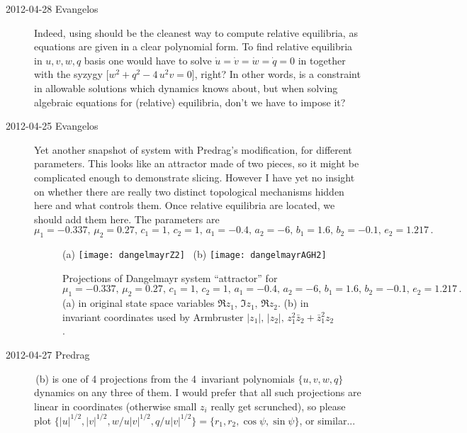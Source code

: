 \begin{description}
\item[2012-04-28 Evangelos] Indeed, using  should be the
cleanest way to compute relative equilibria, as equations are given in
a clear polynomial form.
To find relative equilibria in $u,v,w,q$ basis
one would have to solve $\dot{u}=\dot{v}=\dot{w}=\dot{q}=0$ in 
together with the syzygy 
[$w^2+q^2 - 4\,u^2v =0$], right?
In other words,  is a constraint in allowable solutions which
dynamics knows about, but when solving algebraic equations for (relative)
equilibria, don't we have to impose it?

\item[2012-04-25 Evangelos] Yet another snapshot of {\twoMode}
system with Predrag's modification, for different parameters. This looks
like an attractor made of two pieces, so it might be complicated enough
to demonstrate slicing. However I have yet no insight on whether there
are really two distinct topological mechanisms hidden here and what
controls them. Once relative equilibria are located, we should add them
here. The parameters are
\[
 \mu_1 = -0.337,\, \mu_2 = 0.27,\, c_1 = 1,\, c_2 = 1,\,
 a_1 = -0.4,\, a_2 = -6,\, b_1 = 1.6,\,  b_2 = -0.1,\, e_2 = 1.217
 \,.
\]

 \begin{figure}[h]
\centering
 (a) \texttt{[image: dangelmayrZ2]}~
 (b) \texttt{[image: dangelmayrAGH2]}~
\caption{Projections of Dangelmayr system 
``attractor'' for $\mu_1 = -0.337,\, \mu_2 = 0.27,\, c_1 = 1,\, c_2 = 1,\,
a_1 = -0.4,\, a_2 = -6,\, b_1 = 1.6,\,  b_2 = -0.1,\, e_2 = 1.217\,.$
(a) in original state space variables $\Re z_1,\,\Im z_1,\,\Re z_2$.
(b) in invariant coordinates used by
Armbruster \etal{}
$|z_1|,\, |z_2|,\, z_1^2 \bar{z}_2 + \bar{z}_1^2 z_2$.
}
 \label{fig:dangelmayrChaos2}
\end{figure}

\item[2012-04-27 Predrag] \,(b) is one of 4
projections from the 4\dmn\ invariant polynomials $\{u,v,w,q\}$ dynamics
on any three of them. I would prefer that all such projections are linear
in coordinates (otherwise small $z_i$ really get scrunched), so please
plot $\{|u|^{1/2},|v|^{1/2},w/u |v|^{1/2} ,q/u |v|^{1/2} \}
= \{r_1,r_2, \cos\psi, \sin\psi \}$, or similar...


\end{description}
